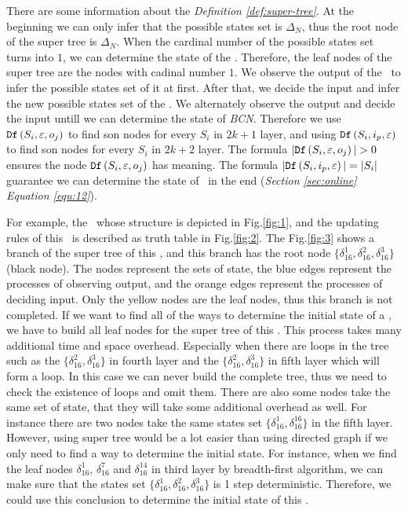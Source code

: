 There are some information about the {\em Definition \ref{def:super-tree}}. At the beginning we can only infer that the possible states set is $\Delta_N$, thus the root node of the super tree is $\Delta_N$. When the cardinal number of the possible states set turns into $1$, we can determine the state of the \BCN. Therefore, the leaf nodes of the super tree are the nodes with cadinal number $1$. We observe the output of the \BCN\ to infer the possible states set of it at first. After that, we decide the input and infer the new possible states set of the \BCN. We alternately observe the output and decide the input untill we can determine the state of {\em BCN}. Therefore we use ${\tt Df}\left(S_i,\varepsilon, o_j\right)$ to find son nodes for every $S_i$ in $2k+1$ layer, and using ${\tt Df}\left(S_i,i_p,\varepsilon\right)$ to find son nodes for every $S_i$ in $2k+2$ layer. The formula $|\Ded\left(S_i,\varepsilon, o_j\right)|>0$ ensures the node ${\tt Df}\left(S_i,\varepsilon, o_j\right)$ has meaning. The formula $|{\tt Df}\left(S_i,i_p,\varepsilon\right)|=|S_i|$ guarantee we can determine the state of \BCN\ in the end ({\em Section \ref{sec:online}} {\em Equation \ref{equ:12}}).
\begin{example}
For example, the \BCN\ whose structure is depicted in Fig.\ref{fig:1}, and the updating rules of this \BCN\ is described as truth table in Fig.\ref{fig:2}. The Fig.\ref{fig:3} shows a branch of the super tree of this \BCN, and this branch has the root node $\{\delta_{16}^1,\delta_{16}^2,\delta_{16}^3\}$ (black node). The nodes represent the sets of state, the blue edges represent the processes of observing output, and the orange edges represent the processes of deciding input. Only the yellow nodes are the leaf nodes, thus this branch is not completed. If we want to find all of the ways to determine the initial state of a \BCN, we have to build all leaf nodes for the super tree of this \BCN. This process takes many additional time and space overhead. Especially when there are loops in the tree such as the $\{\delta_{16}^2,\delta_{16}^3\}$ in fourth layer and the $\{\delta_{16}^2,\delta_{16}^3\}$ in fifth layer which will form a loop. In this case we can never build the complete tree, thus we need to check the existence of loops and omit them. There are also some nodes take the same set of state, that they will take some additional overhead as well. For instance there are two nodes take the same states set $\{\delta_{16}^1,\delta_{16}^{16}\}$ in the fifth layer. However, using super tree would be a lot easier than using directed graph if we only need to find a way to determine the initial state. For instance, when we find the leaf nodes $\delta_{16}^1$, $\delta_{16}^7$ and  $\delta_{16}^{14}$ in third layer by breadth-first algorithm, we can make sure that the states set $\{\delta_{16}^1,\delta_{16}^2,\delta_{16}^3\}$ is 1 step deterministic. Therefore, we could use this conclusion to determine the initial state of this \BCN. 
\end{example}   

